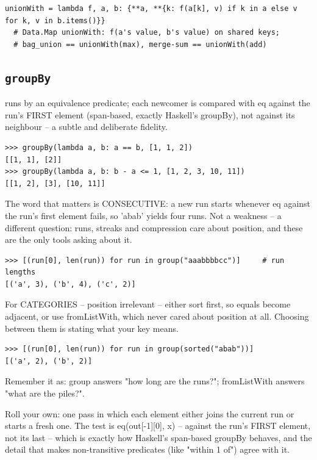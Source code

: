 \documentclass[10pt,letterpaper]{book}
\begin{document}
\begin{lstlisting}[style=ex]
unionWith = lambda f, a, b: {**a, **{k: f(a[k], v) if k in a else v for k, v in b.items()}}
  # Data.Map unionWith: f(a's value, b's value) on shared keys;
  # bag_union == unionWith(max), merge-sum == unionWith(add)
\end{lstlisting}

\subsection{\texttt{groupBy}}\label{def:groupBy}
runs by an equivalence predicate; each newcomer is compared with eq against the run's FIRST element (span-based, exactly Haskell's groupBy), not against its neighbour -- a subtle and deliberate fidelity.
\begin{lstlisting}[style=ex]
>>> groupBy(lambda a, b: a == b, [1, 1, 2])
[[1, 1], [2]]
>>> groupBy(lambda a, b: b - a <= 1, [1, 2, 3, 10, 11])
[[1, 2], [3], [10, 11]]
\end{lstlisting}

The word that matters is CONSECUTIVE: a new run starts whenever eq against the run's first element fails, so 'abab' yields four runs. Not a weakness -- a different question: runs, streaks and compression care about position, and these are the only tools asking about it.

\begin{lstlisting}[style=ex]
>>> [(run[0], len(run)) for run in group("aaabbbbcc")]     # run lengths
[('a', 3), ('b', 4), ('c', 2)]
\end{lstlisting}

For CATEGORIES -- position irrelevant -- either sort first, so equals become adjacent, or use fromListWith, which never cared about position at all. Choosing between them is stating what your key means.

\begin{lstlisting}[style=ex]
>>> [(run[0], len(run)) for run in group(sorted("abab"))]
[('a', 2), ('b', 2)]
\end{lstlisting}

Remember it as: group answers "how long are the runs?"; fromListWith answers "what are the piles?".


Roll your own: one pass in which each element either joins the current run or starts a fresh one. The test is eq(out[-1][0], x) -- against the run's FIRST element, not its last -- which is exactly how Haskell's span-based groupBy behaves, and the detail that makes non-transitive predicates (like "within 1 of") agree with it.
\end{document}
